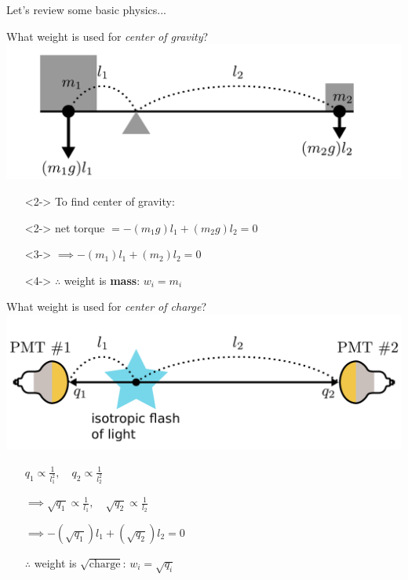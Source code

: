 \documentclass[14pt]{beamer}
\begin{document}
\begin{frame}
	\centering
	{\huge Let's review some basic physics...}
\end{frame}

\begin{frame}{What weight is used for \emph{center of gravity}?}
	\includegraphics[width=\linewidth]{simple_example_of_center_of_gravity.pdf}
	\begin{itemize}
		\item[]<2-> To find center of gravity:
		\item[]<2-> net torque $= -(m_1 g) l_1 + (m_2 g) l_2 = 0$
		\item[]<3-> $\implies -(m_1) l_1 + (m_2) l_2 = 0$
		\item[]<4-> $\therefore$ weight is \textbf{mass}: $w_{i} = m_{i}$
	\end{itemize}
\end{frame}

\begin{frame}{What weight is used for \emph{\color{magenta}center of charge}?}
	\includegraphics[width=\linewidth]{simple_example_of_center_of_charge.pdf}
	\begin{itemize}
		\item[] $q_1 \propto \frac{1}{l_1^2}, \quad q_2 \propto
			\frac{1}{l_2^2}$
		\item[] $\implies \sqrt{q_1} \propto \frac{1}{l_1}, \quad \sqrt{q_2}
			\propto \frac{1}{l_2}$
		\item[] $\implies -(\sqrt{q_1}){l_1} + (\sqrt{q_2}){l_2} = 0$
		\item[] $\therefore$ weight is \textbf{$\sqrt{\text{charge}}$}:
			$w_{i} = \sqrt{q_{i}}$
	\end{itemize}
\end{frame}
\end{document}
